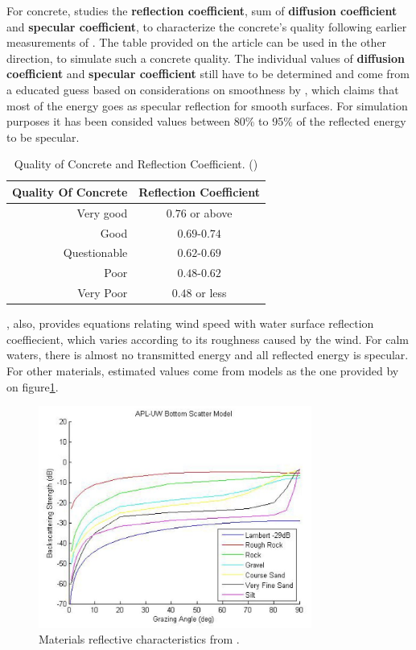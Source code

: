 For concrete, \citet{chirp} studies the \textbf{reflection coefficient}, sum of
\textbf{diffusion coefficient} and \textbf{specular coefficient}, to
characterize the concrete's quality following earlier measurements of
\citet{leslie1949ultrasonic}. The table provided on the article can be used in
the other direction, to simulate such a concrete quality. The individual values of \textbf{diffusion coefficient} and \textbf{specular coefficient} still
have to be determined and come from a educated guess based on considerations on
smoothness by \citet{Etter2013}, which claims that most of the energy goes as
specular reflection for smooth surfaces. For
simulation purposes it has been consided values between 80\% to 95\% of the reflected energy to be specular.

\begin{table}[hbt]
\centering
\begin{tabular}{rc}
Quality Of Concrete & Reflection Coefficient \\
\hline
Very good & $0.76$ or above  \\
Good & $0.69$-$0.74$  \\
Questionable & $0.62$-$0.69$  \\
Poor & $0.48$-$0.62$  \\
Very Poor & $0.48$ or less  \\
\end{tabular}
\caption{Quality of Concrete and Reflection Coefficient.
(\citet{chirp,leslie1949ultrasonic})}
\end{table}

\citet{Etter2013}, also, provides equations relating wind speed with water
surface reflection coeffiecient, which varies according to its roughness caused
by the wind. For calm waters, there is almost no transmitted energy and all
reflected energy is specular. For other materials, estimated values come from
models as the one provided by \citet{miller2015real} on
figure\ref{fig:materials}.

\begin{figure}[h]
	\centering
	\includegraphics[width=0.8\textwidth]{Chap2/fig/materials}
	\caption{Materials reflective characteristics from \citet{miller2015real}.}
	\label{fig:materials}
\end{figure}
